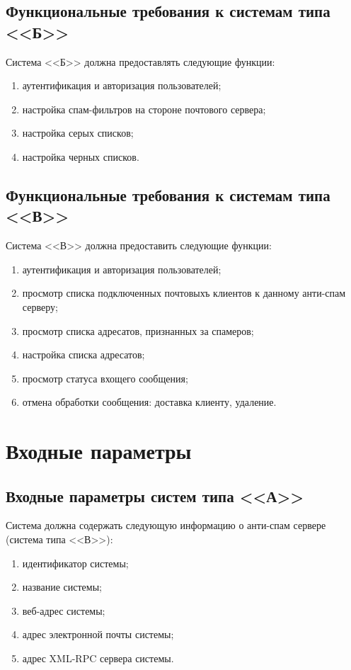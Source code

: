 \subsection{Функциональные требования к системам типа <<Б>>}
Система <<Б>> должна предоставлять следующие функции:
\begin{enumerate}
	\item аутентификация и авторизация пользователей;
	\item настройка спам-фильтров на стороне почтового сервера;
	\item настройка серых списков;
	\item настройка черных списков.
\end{enumerate}


\subsection{Функциональные требования к системам типа <<В>>}
Система <<В>> должна предоставить следующие функции:
\begin{enumerate}
	\item аутентификация и авторизация пользователей;
	\item просмотр списка подключенных почтовыхъ клиентов к данному анти-спам серверу;
	\item просмотр списка адресатов, признанных за спамеров;
	\item настройка списка адресатов;
	\item просмотр статуса вхощего сообщения;
	\item отмена обработки сообщения: доставка клиенту, удаление.
\end{enumerate}



\section{Входные параметры}
\subsection{Входные параметры систем типа <<А>>}
Система должна содержать следующую информацию о анти-спам сервере (система типа <<В>>):
\begin{enumerate}
	\item идентификатор системы;
	\item название системы;
	\item веб-адрес системы;
	\item адрес электронной почты системы;
	\item адрес XML-RPC сервера системы.
\end{enumerate}

